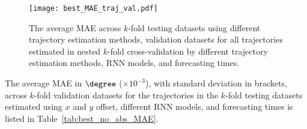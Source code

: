 \begin{figure}[!ht]
	\centering
	\texttt{[image: best\_MAE\_traj\_val.pdf]}
	\caption{The average MAE across $k$-fold testing datasets using different trajectory estimation methods, validation datasets for all trajectories estimated in nested $k$-fold cross-validation by different trajectory estimation methods, RNN models, and forecasting times.}
	\label{fig:best_MAE_traj_val}
\end{figure}

The average MAE in $\degree$ ($\times 10^{-3}$), with standard deviation in brackets, across $k$-fold validation datasets for the trajectories in the $k$-fold testing datasets estimated using $x$ and $y$ offset, different RNN models, and forecasting times is listed in Table~\ref{tab:best_no_abs_MAE}.

\begin{table}[!ht]
	\centering
	\caption{The average MAE in $\degree$ ($\times 10^{-3}$), with standard deviation in brackets, across $k$-fold validation datasets for the trajectories in the $k$-fold testing datasets estimated using $x$ and $y$ offset, different RNN models, and forecasting times.}
	\label{tab:best_no_abs_MAE}
\end{table}

